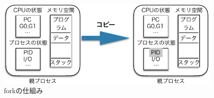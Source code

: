 \documentclass[a4j,dvipdfmx]{jarticle}
\begin{document}
\begin{enumerate}
\begin{enumerate}
\begin{figure}[hbtp]
\begin{center}
\includegraphics[scale=0.8]{fork-crop.pdf}
\caption{forkの仕組み}
\label{fig1}
\end{center}
\end{figure}



\end{enumerate}
\end{enumerate}
\end{document}
